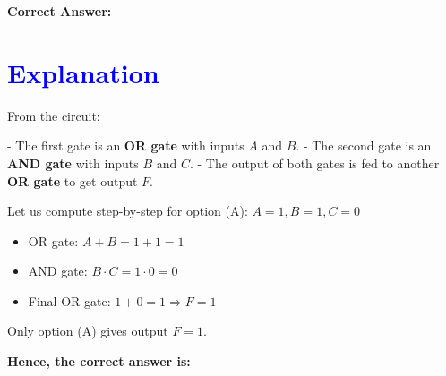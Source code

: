 \documentclass[a4paper,12pt]{article}
\begin{document}
\vspace{1em}

\noindent\textbf{Correct Answer:} 

\vspace{1cm}

\section*{\textcolor{blue}{Explanation}}

From the circuit:

- The first gate is an \textbf{OR gate} with inputs \( A \) and \( B \).
- The second gate is an \textbf{AND gate} with inputs \( B \) and \( C \).
- The output of both gates is fed to another \textbf{OR gate} to get output \( F \).

Let us compute step-by-step for option (A): \( A = 1, B = 1, C = 0 \)

\begin{itemize}
    \item OR gate: \( A + B = 1 + 1 = 1 \)
    \item AND gate: \( B \cdot C = 1 \cdot 0 = 0 \)
    \item Final OR gate: \( 1 + 0 = 1 \Rightarrow F = 1 \)
\end{itemize}

\noindent
Only option (A) gives output \( F = 1 \).

\vspace{0.5em}
\noindent\textbf{Hence, the correct answer is:} 
\end{document}
